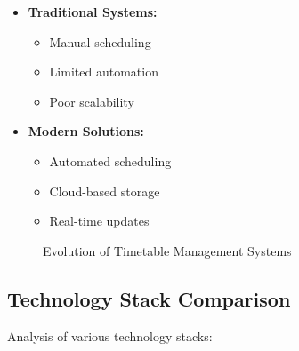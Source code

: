 \documentclass[12pt,a4paper]{report}
\begin{document}
\begin{itemize}
    \item \textbf{Traditional Systems:}
        \begin{itemize}
            \item Manual scheduling
            \item Limited automation
            \item Poor scalability
        \end{itemize}
    \item \textbf{Modern Solutions:}
        \begin{itemize}
            \item Automated scheduling
            \item Cloud-based storage
            \item Real-time updates
        \end{itemize}
\end{itemize}

\begin{figure}[H]
\centering
{}
\caption{Evolution of Timetable Management Systems}
\label{fig:evolution}
\end{figure}

\subsection{Technology Stack Comparison}
Analysis of various technology stacks:
\end{document}
